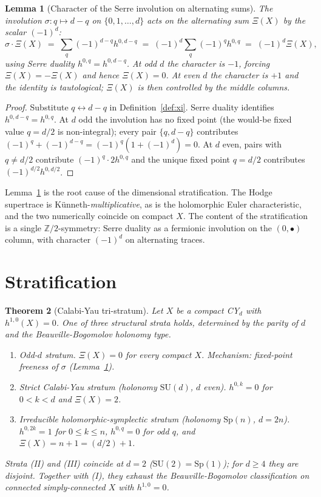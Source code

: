 \documentclass[11pt]{article}
\newtheorem{theorem}{Theorem}[section]
\newtheorem{lemma}[theorem]{Lemma}
\providecommand{\Z}{\mathbb{Z}}
\begin{document}
\begin{lemma}[Character of the Serre involution on alternating sums]
\label{lem:serre-sign}
The involution $\sigma\colon q\mapsto d-q$ on $\{0,1,\dots,d\}$ acts on
the alternating sum $\Xi(X)$ by the scalar $(-1)^{d}$:
\[
   \sigma\cdot\Xi(X)\;=\;\sum_{q}(-1)^{d-q}h^{0,d-q}
   \;=\;(-1)^{d}\sum_{q}(-1)^{q}h^{0,q}
   \;=\;(-1)^{d}\Xi(X),
\]
using Serre duality $h^{0,q}=h^{0,d-q}$. At odd $d$ the character is
$-1$, forcing $\Xi(X)=-\Xi(X)$ and hence $\Xi(X)=0$. At even $d$ the
character is $+1$ and the identity is tautological; $\Xi(X)$ is then
controlled by the middle columns.
\end{lemma}

\begin{proof}
Substitute $q\leftrightarrow d-q$ in Definition~\ref{def:xi}. Serre
duality identifies $h^{0,d-q}=h^{0,q}$. At $d$ odd the involution has no
fixed point (the would-be fixed value $q=d/2$ is non-integral); every
pair $\{q,d-q\}$ contributes $(-1)^{q}+(-1)^{d-q}=(-1)^{q}(1+(-1)^{d})=0$.
At $d$ even, pairs with $q\ne d/2$ contribute
$(-1)^{q}\cdot 2h^{0,q}$ and the unique fixed point $q=d/2$ contributes
$(-1)^{d/2}h^{0,d/2}$.
\end{proof}

Lemma~\ref{lem:serre-sign} is the root cause of the dimensional
stratification. The Hodge supertrace is
K\"unneth-\emph{multiplicative}, as is the holomorphic Euler
characteristic, and the two numerically coincide on compact $X$. The
content of the stratification is a single $\Z/2$-symmetry: Serre duality
as a fermionic involution on the $(0,\bullet)$ column, with character
$(-1)^d$ on alternating traces.

\section{Stratification}
\label{sec:stratification}

\begin{theorem}[Calabi-Yau tri-stratum]
\label{thm:tri-stratum}
Let $X$ be a compact CY$_d$ with $h^{1,0}(X)=0$. One of three structural
strata holds, determined by the parity of $d$ and the
Beauville-Bogomolov holonomy type.
\begin{enumerate}
\item[\textup{(I)}] \emph{Odd-$d$ stratum.} $\Xi(X)=0$ for every compact
      $X$. Mechanism: fixed-point freeness of $\sigma$
      (Lemma~\ref{lem:serre-sign}).
\item[\textup{(II)}] \emph{Strict Calabi-Yau stratum (holonomy
      $\mathrm{SU}(d)$, $d$ even).} $h^{0,k}=0$ for $0<k<d$ and
      $\Xi(X)=2$.
\item[\textup{(III)}] \emph{Irreducible holomorphic-symplectic
      stratum (holonomy $\mathrm{Sp}(n)$, $d=2n$).} $h^{0,2k}=1$ for
      $0\le k\le n$, $h^{0,q}=0$ for odd $q$, and
      $\Xi(X)=n+1=(d/2)+1$.
\end{enumerate}
Strata \textup{(II)} and \textup{(III)} coincide at $d=2$
($\mathrm{SU}(2)=\mathrm{Sp}(1)$); for $d\ge 4$ they are disjoint.
Together with \textup{(I)}, they exhaust the Beauville-Bogomolov
classification on connected simply-connected $X$ with $h^{1,0}=0$.
\end{theorem}
\end{document}
